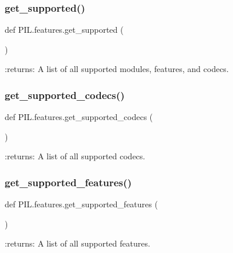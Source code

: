 \subsubsection{\texorpdfstring{get\+\_\+supported()}{get\_supported()}}
{\footnotesize\ttfamily def P\+I\+L.\+features.\+get\+\_\+supported (\begin{DoxyParamCaption}{ }\end{DoxyParamCaption})}

\begin{DoxyVerb}:returns: A list of all supported modules, features, and codecs.
\end{DoxyVerb}
 \mbox{\label{namespacePIL_1_1features_adf11b3cf60d59d7d58487d6864bc28a6}} 
\subsubsection{\texorpdfstring{get\+\_\+supported\+\_\+codecs()}{get\_supported\_codecs()}}
{\footnotesize\ttfamily def P\+I\+L.\+features.\+get\+\_\+supported\+\_\+codecs (\begin{DoxyParamCaption}{ }\end{DoxyParamCaption})}

\begin{DoxyVerb}:returns: A list of all supported codecs.
\end{DoxyVerb}
 \mbox{\label{namespacePIL_1_1features_a5685e2e0e76d072df197c5fffb2ff9d2}} 
\subsubsection{\texorpdfstring{get\+\_\+supported\+\_\+features()}{get\_supported\_features()}}
{\footnotesize\ttfamily def P\+I\+L.\+features.\+get\+\_\+supported\+\_\+features (\begin{DoxyParamCaption}{ }\end{DoxyParamCaption})}

\begin{DoxyVerb}:returns: A list of all supported features.
\end{DoxyVerb}
 \mbox{\label{namespacePIL_1_1features_a479ecf59adbc4b7927878afa7f146b48}} 
